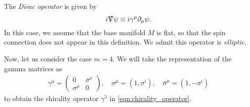 \documentclass[a4paper,pdftex,10pt]{report}
\begin{document}
The \textit{Dirac operator} is given by
\begin{equation}
  i\slashed{\nabla}\psi
  \equiv
  i\gamma^{\mu}\partial_{\mu}\psi
  .
\end{equation}
In this case, we assume that the base manifold $M$ is flat, so that the spin connection does not appear in this definition. We admit this operator is \textit{elliptic}. 

Now, let us consider the case $m=4$. We will take the representation of the gamma matrices as 
\begin{eqnarray}
  \gamma^{\mu}
  =
  \begin{pmatrix}
    0 & \bar{\sigma}^{\mu} \\
    \sigma^\mu & 0
  \end{pmatrix}
  ,\quad
  \sigma^{\mu}
  =
  (1,\sigma^{i})
  ,\quad 
  \bar{\sigma}^{\mu}
  =
  (1,-\sigma^{i})
\end{eqnarray}
to obtain the chirality operator $\gamma^{5}$ in \eqref{eqn:chirality_operator}.



















\clearpage



\nocite{Peskin:1995}
\nocite{Nair:2005}
\nocite{Weinberg:1996kr}
\nocite{Weinberg:1995mt}
\nocite{Weinberg:2000}

\nocite{Witten:1982df}
\nocite{Witten:1982im}

\nocite{Seiberg:1994aj}
\nocite{Seiberg:1994rs}
\nocite{Alvarez-Gaume:1996ohl}
\nocite{Tachikawa:2013kta}

\nocite{Nakahara:2003}

\end{document}
